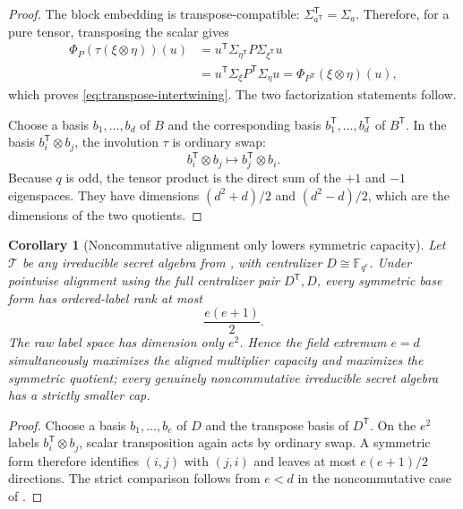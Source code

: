 \documentclass[11pt]{article}
\newtheorem{corollary}[corollary]{Corollary}
\newcommand{\F}{\mathbb F}
\newcommand{\transpose}{\mathsf T}
\begin{document}
\begin{proof}
The block embedding is transpose-compatible:
$\Sigma_{a^\transpose}^\transpose=\Sigma_a$.  Therefore, for a pure
tensor, transposing the scalar gives
\begin{align*}
 \Phi_P(\tau(\xi\otimes\eta))(u)
 &=u^\transpose\Sigma_{\eta^\transpose}P
                  \Sigma_{\xi^\transpose}u\\
 &=u^\transpose\Sigma_\xi P^\transpose\Sigma_\eta u
 =\Phi_{P^\transpose}(\xi\otimes\eta)(u),
\end{align*}
which proves \eqref{eq:transpose-intertwining}.  The two factorization
statements follow.

Choose a basis $b_1,\ldots,b_d$ of $B$ and the corresponding basis
$b_1^\transpose,\ldots,b_d^\transpose$ of $B^\transpose$.  In the basis
$b_i^\transpose\otimes b_j$, the involution $\tau$ is ordinary swap:
\[
 b_i^\transpose\otimes b_j
 \longmapsto b_j^\transpose\otimes b_i.
\]
Because $q$ is odd, the tensor product is the direct sum of the $+1$ and
$-1$ eigenspaces.  They have dimensions $(d^2+d)/2$ and $(d^2-d)/2$,
which are the dimensions of the two quotients.
\end{proof}

\begin{corollary}[Noncommutative alignment only lowers symmetric capacity]
\label{cor:noncommutative-capacity}
Let $\mathcal T$ be any irreducible secret algebra from
, with centralizer
$D\cong\F_{q^e}$.  Under pointwise alignment using the full centralizer pair
$D^\transpose,D$, every symmetric base form has ordered-label rank at most
\begin{equation}
  \frac{e(e+1)}2.                                  \label{eq:general-centralizer-hermitian-cap}
\end{equation}
The raw label space has dimension only $e^2$.  Hence the field extremum
$e=d$ simultaneously maximizes the aligned multiplier capacity and maximizes
the symmetric quotient; every genuinely noncommutative irreducible secret
algebra has a strictly smaller cap.
\end{corollary}

\begin{proof}
Choose a basis $b_1,\ldots,b_e$ of $D$ and the transpose basis of
$D^\transpose$.  On the $e^2$ labels
$b_i^\transpose\otimes b_j$, scalar transposition again acts by ordinary
swap.  A symmetric form therefore identifies $(i,j)$ with $(j,i)$ and leaves
at most $e(e+1)/2$ directions.  The strict comparison follows from $e<d$ in
the noncommutative case of .
\end{proof}
\end{document}
